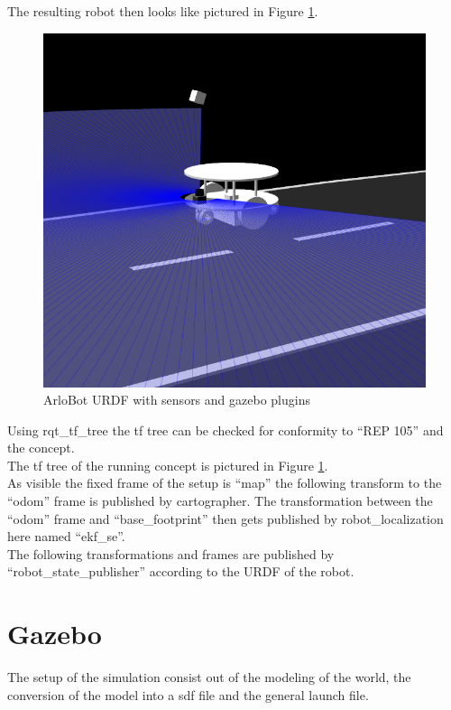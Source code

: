 The resulting robot then looks like pictured in Figure \ref{arlourdf}.

\begin{figure}[H]
	\includegraphics[width=\textwidth]{Pictures/arlourdf}
	\caption{ArloBot URDF with sensors and gazebo plugins}
	\label{arlourdf}
\end{figure}


Using rqt\_tf\_tree the tf tree can be checked for conformity to ``REP 105'' and the concept.\\ 
The tf tree of the running concept is pictured in Figure \ref{}.\\
As visible the fixed frame of the setup is ``map'' the following transform to the ``odom'' frame is published by cartographer. The transformation between the ``odom'' frame and ``base\_footprint'' then gets published by robot\_localization here named ``ekf\_se''.\\
The following transformations and frames are published by ``robot\_state\_publisher'' according to the URDF of the robot.

\section{Gazebo}
The setup of the simulation consist out of the modeling of the world, the conversion of the model into a sdf file and the general launch file.

